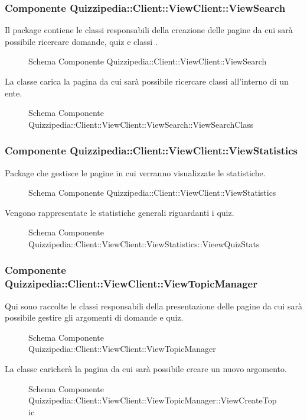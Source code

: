 \subsubsection{Componente Quizzipedia::Client::ViewClient::ViewSearch}
Il package contiene le classi responsabili della creazione delle pagine da cui sarà possibile ricercare domande, quiz e classi .
\begin{figure}[H]
\centering
\noindent{}
\caption{Schema Componente Quizzipedia::Client::ViewClient::ViewSearch}
\end{figure}
La classe carica la pagina da cui sarà possibile ricercare classi all'interno di un ente.
\begin{figure}[H]
\centering
\noindent{}
\caption{Schema Componente Quizzipedia::Client::ViewClient::ViewSearch::ViewSearchClass}
\end{figure}
\subsubsection{Componente Quizzipedia::Client::ViewClient::ViewStatistics}
Package che gestisce le pagine in cui verranno visualizzate le statistiche.
\begin{figure}[H]
\centering
\noindent{}
\caption{Schema Componente Quizzipedia::Client::ViewClient::ViewStatistics}
\end{figure}
Vengono rappresentate le statistiche generali riguardanti i quiz.
\begin{figure}[H]
\centering
\noindent{}
\caption{Schema Componente Quizzipedia::Client::ViewClient::ViewStatistics::VieewQuizStats}
\end{figure}
\subsubsection{Componente Quizzipedia::Client::ViewClient::ViewTopicManager}
Qui sono raccolte le classi responsabili della presentazione delle pagine da cui sarà possibile gestire gli argomenti di domande e quiz.
\begin{figure}[H]
\centering
\noindent{}
\caption{Schema Componente Quizzipedia::Client::ViewClient::ViewTopicManager}
\end{figure}
La classe caricherà la pagina da cui sarà possibile creare un nuovo argomento.
\begin{figure}[H]
\centering
\noindent{}
\caption{Schema Componente Quizzipedia::Client::ViewClient::ViewTopicManager::ViewCreateTopic}
\end{figure}
